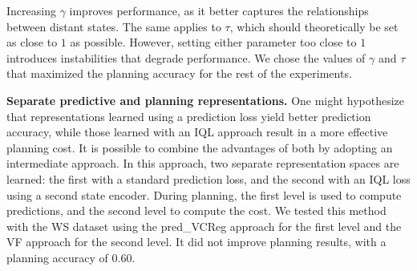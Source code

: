 \documentclass{article} %
\begin{document}
Increasing $\gamma$ improves performance, as it better captures the relationships between distant states. The same applies to $\tau$, which should theoretically be set as close to $1$ as possible. However, setting either parameter too close to $1$ introduces instabilities that degrade performance. We chose the values of $\gamma$ and $\tau$ that maximized the planning accuracy for the rest of the experiments.

\textbf{Separate predictive and planning representations.} One might hypothesize that representations learned using a prediction loss yield better prediction accuracy, while those learned with an IQL approach result in a more effective planning cost. It is possible to combine the advantages of both by adopting an intermediate approach. In this approach, two separate representation spaces are learned: the first with a standard prediction loss, and the second with an IQL loss using a second state encoder. During planning, the first level is used to compute predictions, and the second level to compute the cost. We tested this method with the WS dataset using the pred\_VCReg approach for the first level and the VF approach for the second level. It did not improve planning results, with a planning accuracy of $0.60$.
\end{document}
